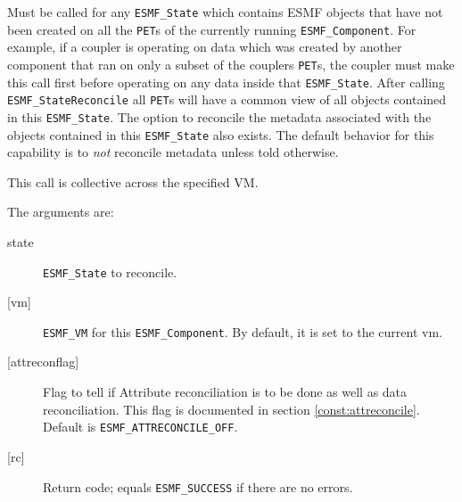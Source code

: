        Must be called for any {\tt ESMF\_State} which contains ESMF objects
       that have not been created on all the {\tt PET}s of the currently
       running {\tt ESMF\_Component}.
       For example, if a coupler is operating on data
       which was created by another component that ran on only a subset
       of the couplers {\tt PET}s, the coupler must make this call first
       before operating on any data inside that {\tt ESMF\_State}.
       After calling {\tt ESMF\_StateReconcile} all {\tt PET}s will have
       a common view of all objects contained in this {\tt ESMF\_State}.
       The option to reconcile the metadata associated with the objects
       contained in this {\tt ESMF\_State} also exists.  The default behavior
       for this capability is to {\it not} reconcile metadata unless told
       otherwise.
  
       This call is collective across the specified VM.
  
       The arguments are:
       \begin{description}
       \item[state]
         {\tt ESMF\_State} to reconcile.
       \item[{[vm]}]
         {\tt ESMF\_VM} for this {\tt ESMF\_Component}.  By default, it is set to the current vm.
       \item[{[attreconflag]}]
         Flag to tell if Attribute reconciliation is to be done as well as data reconciliation.
         This flag is documented in section \ref{const:attreconcile}.  Default is
         {\tt ESMF\_ATTRECONCILE\_OFF}.
       \item[{[rc]}]
         Return code; equals {\tt ESMF\_SUCCESS} if there are no errors.
       \end{description}
  
\setlength{\parskip}{\oldparskip}
\setlength{\parindent}{\oldparindent}
\setlength{\baselineskip}{\oldbaselineskip}
